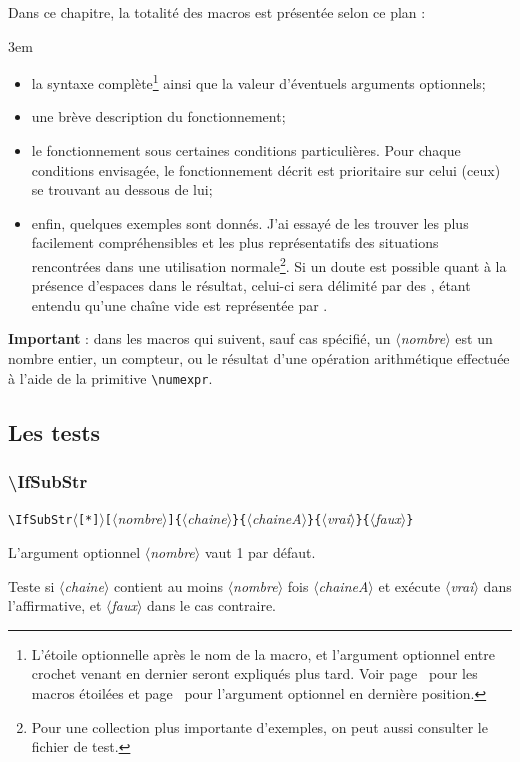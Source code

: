 \documentclass[a4paper,10pt,french]{article}
\newcommand\guill[1]{\og{}#1\fg{}}
\newcommand\argu[1]{$\langle$\textit{#1}$\rangle$}
\newcommand\ARGU[1]{\texttt{\color{black}\{}\argu{#1}\texttt{\color{black}\}}}
\newcommand\arguC[1]{\texttt{\color{black}[}\argu{#1}\texttt{\color{black}]}}
\newcommand\etoile{$\langle$\texttt{[*]}$\rangle$}
\begin{document}
Dans ce chapitre, la totalité des macros est présentée selon ce plan :\par\nobreak\smallskip\parindent3em
\begin{itemize}
	\item la syntaxe complète\footnote{L'étoile optionnelle après le nom de la macro, et l'argument optionnel entre crochet venant en dernier seront expliqués plus tard. Voir page~\pageref{macrosetoilees} pour les macros étoilées et page~\pageref{argumentoptionnel} pour l'argument optionnel en dernière position.} ainsi que la valeur d'éventuels arguments optionnels;
	\item une brève description du fonctionnement;
	\item le fonctionnement sous certaines conditions particulières. Pour chaque conditions envisagée, le fonctionnement décrit est prioritaire sur celui (ceux) se trouvant au dessous de lui;
	\item enfin, quelques exemples sont donnés. J'ai essayé de les trouver les plus facilement compréhensibles et les plus représentatifs des situations rencontrées dans une utilisation normale\footnote{Pour une collection plus importante d'exemples, on peut aussi consulter le fichier de test.}. Si un doute est possible quant à la présence d'espaces dans le résultat, celui-ci sera délimité par des \guill{\textbar}, étant entendu qu'une chaîne vide est représentée par \guill{\textbar\textbar}.
\end{itemize}\parindent0pt\smallskip

\textbf{Important} : dans les macros qui suivent, sauf cas spécifié, un \argu{nombre} est un nombre entier, un compteur, ou le résultat d'une opération arithmétique effectuée à l'aide de la primitive \verb|\numexpr|.

\subsection{Les tests}
\subsubsection{\ttfamily\textbackslash IfSubStr}
\verb|\IfSubStr|\etoile\arguC{nombre}\ARGU{chaine}\ARGU{chaineA}\ARGU{vrai}\ARGU{faux}
\smallskip

L'argument optionnel \argu{nombre} vaut 1 par défaut.\par\nobreak\smallskip

Teste si \argu{chaine} contient au moins \argu{nombre} fois \argu{chaineA} et exécute \argu{vrai} dans l'affirmative, et \argu{faux} dans le cas contraire.\medskip
\end{document}
